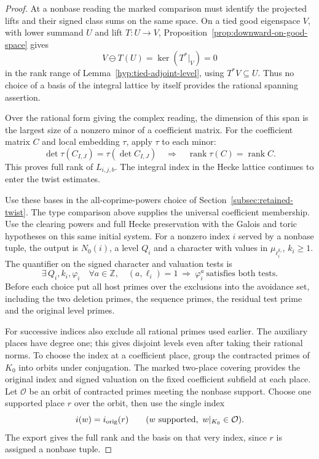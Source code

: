 \begin{proof}
At a nonbase reading the marked comparison must identify the projected lifts and their signed class sums on the same space. On a tied good eigenspace \(V\), with lower summand \(U\) and lift \(T:U\to V\), Proposition~\ref{prop:downward-on-good-space} gives
\[
 V\ominus T(U)=\ker(T^*|_V)=0
\]
in the rank range of Lemma~\ref{hyp:tied-adjoint-level}, using \(T^*V\subseteq U\). Thus no choice of a basis of the integral lattice by itself provides the rational spanning assertion. 

Over the rational form giving
the complex reading, the dimension of this span is the largest
size of a nonzero minor of a coefficient matrix. For the coefficient matrix \(C\) and local embedding \(\tau\), apply \(\tau\) to each minor:
\[
 \det\tau(C_{I,J})=\tau(\det C_{I,J})\quad\Longrightarrow\quad\operatorname{rank}\tau(C)=\operatorname{rank}C .
\] This proves full rank
of \(L_{i,j,b}\). The integral index in the Hecke lattice
continues to enter the twist estimates.
\label{cor:automorphic-realization-54}

Use these bases in the all-coprime-powers choice of
Section~\ref{subsec:retained-twist}. The type comparison
above supplies the universal coefficient membership. Use the
clearing powers and full Hecke preservation with the Galois
and toric hypotheses on this same initial system. For a
nonzero index \(i\) served by a nonbase tuple, the output is
\(N_0(i)\), a level \(Q_i\) and a character with values in
\(\mu_{\ell_i^{k_i}}\), \(k_i\ge1\). The quantifier on the signed
character and valuation tests is
\[
 \exists\, Q_i,k_i,\varphi_i\quad
 \forall a\in\mathbb Z,\quad (a,\ell_i)=1
       \ \Longrightarrow\ \varphi_i^a\ \text{satisfies both tests}.
\]
Before each choice put all host primes over the exclusions into
the avoidance set, including the two deletion primes, the sequence
primes, the residual test prime and the original level primes.

For successive indices also exclude all rational primes used
earlier. The auxiliary places have degree one; this gives disjoint
levels even after taking their rational norms.
To choose the index at a coefficient place, group the contracted
primes of \(K_0\) into orbits under conjugation. The marked
two-place covering provides the original index and signed
valuation on the fixed coefficient subfield at each place. Let \(\mathcal O\) be an orbit of contracted primes meeting the nonbase support. Choose one supported place \(r\) over the orbit, then use the single index
\[
 i(w)=i_{\rm orig}(r)\qquad(w\text{ supported},\ w|_{K_0}\in\mathcal O).
\] The
export gives the full rank and the basis on that very index,
since \(r\) is assigned a nonbase tuple.


\end{proof}

